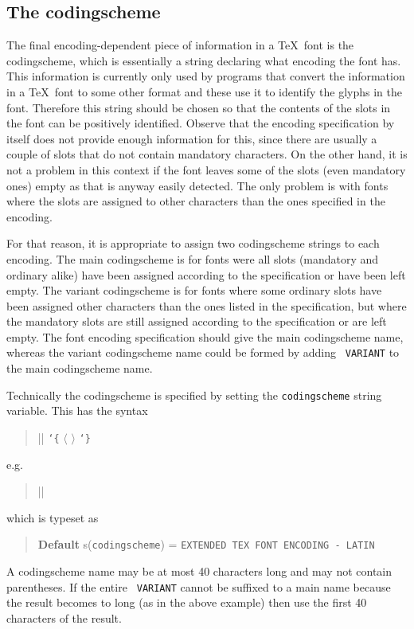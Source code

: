 \documentclass[a4paper]{article}
\makeatletter
\DeclareRobustCommand\meta[1]{%
   \ensuremath{\langle}%
   \sbox{\z@}{%
      \setlanguage\l@nohyphenation
      \normalfont\itshape #1\/%
      \setlanguage\language
   }%
   \unhbox\z@
   \ensuremath{\rangle}%
}
\DeclareRobustCommand\marg[1]{%
   \texttt{\char`\{}\meta{#1}\texttt{\char`\}}%
}
\makeatother
\begin{document}
\subsection{The codingscheme}

The final encoding-dependent piece of information in a \TeX\ font is 
the codingscheme, which is essentially a string declaring what 
encoding the font has. This information is currently only used by 
programs that convert the information in a \TeX\ font to some other 
format and these use it to identify the glyphs in the font. Therefore 
this string should be chosen so that the contents of the slots in the 
font can be positively identified. Observe that the encoding 
specification by itself does not provide enough information for this, 
since there are usually a couple of slots that do not contain 
mandatory characters. On the other hand, it is not a problem in this 
context if the font leaves some of the slots (even mandatory ones) 
empty as that is anyway easily detected. The only problem is with 
fonts where the slots are assigned to other characters than the ones 
specified in the encoding.

For that reason, it is appropriate to assign two codingscheme strings 
to each encoding. The main codingscheme is for fonts were all slots 
(mandatory and ordinary alike) have been assigned according to the 
specification or have been left empty. The variant codingscheme is for 
fonts where some ordinary slots have been assigned other characters 
than the ones listed in the specification, but where the mandatory 
slots are still assigned according to the specification or are left 
empty. The font encoding specification should give the main 
codingscheme name, whereas the variant codingscheme name could be 
formed by adding \verb*| VARIANT| to the main codingscheme name.

Technically the codingscheme is specified by setting the 
\texttt{codingscheme} string variable. This has the syntax
\begin{quote}
  ||\marg{codingscheme name}
\end{quote}
e.g.
\begin{quote}
  ||
\end{quote}
which is typeset as
\begin{quote}
  \textbf{Default} s(\texttt{codingscheme}) = 
  \verb*|EXTENDED TEX FONT ENCODING - LATIN|
\end{quote}
A codingscheme name may be at most 40 characters long and may not 
contain parentheses. If the entire \verb*| VARIANT| cannot be suffixed 
to a main name because the result becomes to long (as in the above 
example) then use the first 40 characters of the result.
\end{document}
